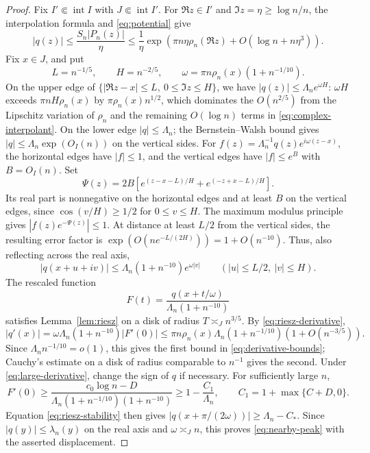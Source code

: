 \documentclass[11pt]{article}
\theoremstyle{remark}
\numberwithin{equation}{section}
\begin{document}
\begin{proof}
Fix \(I'\Subset\operatorname{int}I\) with \(J\Subset\operatorname{int}I'\).
For \(\Re z\in I'\) and \(\Im z=\eta\ge\log n/n\), the
interpolation formula and \eqref{eq:potential} give
\begin{equation}\label{eq:complex-interpolant}
 |q(z)|\le\frac{S_n|P_n(z)|}{\eta}
 \le\frac1\eta\exp\!\left(\pi n\eta\rho_n(\Re z)
                              +O(\log n+n\eta^3)\right).
\end{equation}
Fix \(x\in J\), and put
\[
 L=n^{-1/5},\qquad H=n^{-2/5},\qquad
 \omega=\pi n\rho_n(x)(1+n^{-1/10}).
\]
On the upper edge of \(\{|\Re z-x|\le L,\ 0\le\Im z\le H\}\),
we have \(|q(z)|\le\Lambda_n e^{\omega H}\): \(\omega H\) exceeds
\(\pi nH\rho_n(x)\) by \(\pi\rho_n(x)n^{1/2}\), which dominates the
\(O(n^{2/5})\) from the Lipschitz variation of \(\rho_n\) and the
remaining \(O(\log n)\) terms in \eqref{eq:complex-interpolant}.
On the lower edge \(|q|\le\Lambda_n\); the Bernstein--Walsh bound
gives \(|q|\le\Lambda_n\exp(O_I(n))\) on the vertical sides.
For \(f(z)=\Lambda_n^{-1}q(z)e^{i\omega(z-x)}\), the horizontal
edges have \(|f|\le1\), and the vertical edges have \(|f|\le e^B\)
with \(B=O_I(n)\). Set
\[
 \Psi(z)=2B\left[e^{(z-x-L)/H}+e^{(-z+x-L)/H}\right].
\]
Its real part is nonnegative on the horizontal edges and at least
\(B\) on the vertical edges, since \(\cos(v/H)\ge1/2\) for \(0\le v\le H\).
The maximum modulus principle gives \(|f(z)e^{-\Psi(z)}|\le1\).
At distance at least \(L/2\) from the vertical sides, the resulting error
factor is \(\exp(O(n e^{-L/(2H)}))=1+O(n^{-10})\). Thus, also reflecting across
the real axis,
\begin{equation}\label{eq:local-growth}
 |q(x+u+iv)|\le\Lambda_n(1+n^{-10})e^{\omega|v|}
 \qquad(|u|\le L/2,\ |v|\le H).
\end{equation}
The rescaled function
\[
 F(t)=\frac{q(x+t/\omega)}{\Lambda_n(1+n^{-10})}
\]
satisfies Lemma~\ref{lem:riesz} on a disk of radius
\(T\asymp_J n^{3/5}\).
By \eqref{eq:riesz-derivative},
\[
 |q'(x)|=\omega\Lambda_n(1+n^{-10})|F'(0)|
 \le\pi n\rho_n(x)\Lambda_n(1+n^{-1/10})
                       (1+O(n^{-3/5})).
\]
Since \(\Lambda_n n^{-1/10}=o(1)\), this gives the first bound in
\eqref{eq:derivative-bounds}; Cauchy's estimate
on a disk of radius comparable to \(n^{-1}\) gives the second.
Under \eqref{eq:large-derivative}, change the sign of \(q\) if necessary.
For sufficiently large \(n\),
\[
 F'(0)\ge\frac{c_0\log n-D}
                 {\Lambda_n(1+n^{-1/10})(1+n^{-10})}
 \ge1-\frac{C_1}{\Lambda_n},\qquad C_1=1+\max\{C+D,0\}.
\]
Equation \eqref{eq:riesz-stability} then gives
\(|q(x+\pi/(2\omega))|\ge\Lambda_n-C_*\).
Since \(|q(y)|\le\lambda_n(y)\) on the real axis and \(\omega\asymp_J n\),
this proves \eqref{eq:nearby-peak} with the asserted displacement.
\end{proof}
\end{document}
